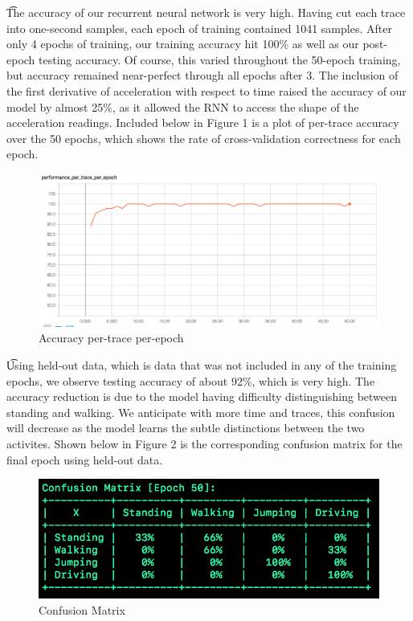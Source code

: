 \documentclass{article}
\begin{document}
\t The accuracy of our recurrent neural network is very high. Having cut each trace into one-second samples, each epoch of training contained 1041 samples. After only 4 epochs of training, our training accuracy hit 100\% as well as our post-epoch testing accuracy. Of course, this varied throughout the 50-epoch training, but accuracy remained near-perfect through all epochs after 3. The inclusion of the first derivative of acceleration with respect to time raised the accuracy of our model by almost 25\%, as it allowed the RNN to access the shape of the acceleration readings. Included below in Figure 1 is a plot of per-trace accuracy over the 50 epochs, which shows the rate of cross-validation correctness for each epoch.

\begin{figure}[h]
    \centering
    \includegraphics[width=0.7\linewidth]{figures/acc_ptpe.png}
    \caption{Accuracy per-trace per-epoch \label{fig:acc_ptpe}}
\end{figure}

\t Using held-out data, which is data that was not included in any of the training epochs, we observe testing accuracy of about 92\%, which is very high. The accuracy reduction is due to the model having difficulty distinguishing between standing and walking. We anticipate with more time and traces, this confusion will decrease as the model learns the subtle distinctions between the two activites. Shown below in Figure 2 is the corresponding confusion matrix for the final epoch using held-out data.

\begin{figure}[h]
    \centering
    \includegraphics[width=0.8\linewidth]{figures/confusion.png}
    \caption{Confusion Matrix \label{fig:confusion}}
\end{figure}
\end{document}
